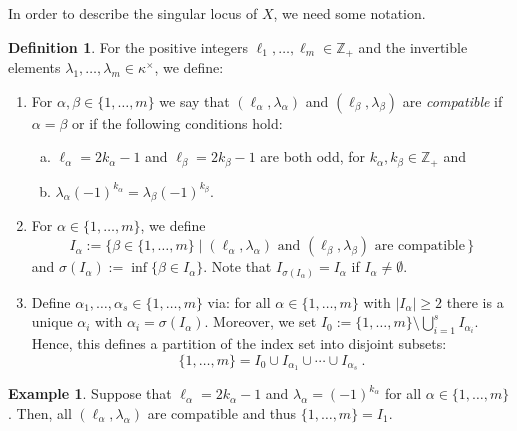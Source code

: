 \documentclass[letter,11pt]{amsart}
\newcommand{\ZZ}{\ensuremath{\mathbb{Z}}}
\theoremstyle{theorem}
\theoremstyle{definition}
\newtheorem{defi}[Thm]{Definition} %
\newtheorem{example}[Thm]{Example}
\newcommand{\len}{\ell}
\newcommand{\halflen}{k}
\numberwithin{equation}{section}
\begin{document}
In order to describe the singular locus of $ X $, we need some notation.
 
 \begin{defi}
 	\label{Def:partition}
 	For the positive integers $ \len_1, \ldots, \len_m \in \ZZ_+ $ and the invertible elements $\lambda_1, \ldots, \lambda_m \in \kappa^\times $,
 	we define: 
 	
 	\begin{enumerate}[(1)]
 	\item \label{item:compatible}
 	For $ \alpha, \beta \in \{ 1, \ldots, m \} $ %
 	we say that 
 	$ (\len_\alpha, \lambda_\alpha) $ and $ (\len_\beta, \lambda_\beta) $ 
 	are {\em compatible}
 	if 
 	$ \alpha = \beta $ or if the following conditions hold:
 	\begin{enumerate}[(a)]
 		\item
 		$ \len_\alpha = 2 \halflen_\alpha - 1 $ and $\len_\beta = 2 \halflen_\beta - 1  $ are both odd, 
 		for $ \halflen_\alpha, \halflen_\beta \in \ZZ_+ $
 		and
 		
 		\item
 		$ \lambda_\alpha (-1)^{\halflen_\alpha} = \lambda_\beta (-1)^{\halflen_\beta}  $. 
 	\end{enumerate}
 
	\item 
	For $ \alpha \in \{ 1, \ldots, m \} $,
	we define 
	\[
		I_\alpha := 
		\{
			\beta \in \{ 1, \ldots, m \}
			\mid 
			 (\len_\alpha, \lambda_\alpha) 
			\mbox{ and }
			(\len_\beta, \lambda_\beta) 
			\mbox{ are compatible} 
			\,
		\}
	\]
	and $ \sigma(I_\alpha) := \inf\{ \beta \in I_\alpha \}  $.
	Note that $ I_{\sigma(I_\alpha)} = I_\alpha $ if $ I_\alpha \neq \emptyset $.
 	
 	\item\label{Def:partition-item}
 	Define $ \alpha_1, \ldots, \alpha_s \in \{1, \ldots, m \} $ 
 	via:
 		for all $ \alpha \in \{ 1, \ldots, m \} $ with $ |I_{\alpha}| \geq 2 $ there is a unique $ \alpha_i $ with 
 		$ \alpha_i = \sigma(I_\alpha) $.
 	Moreover, we set $ I_0 := \{ 1, \ldots, m \} \setminus \bigcup_{i=1}^s I_{\alpha_i} $. 
 	Hence, this defines a partition of the index set into disjoint subsets:
 	\[
	 	\{ 1 , \ldots , m \}  = I_0 \cup I_{\alpha_1} \cup \cdots \cup I_{\alpha_s}
	 	\ .
 	\]
 \end{enumerate}
 \end{defi}
 
 \begin{example}
 	\label{Ex:Comaptible}
	\label{it:compat_A_1}
 	Suppose that $ \ell_\alpha = 2 k_\alpha - 1 $ 
 	and $ \lambda_\alpha = (-1)^{k_\alpha} $
 	for all $ \alpha \in \{ 1 , \ldots, m \} $. 
 	Then, all $ (\ell_\alpha, \lambda_\alpha) $ are compatible and thus $ \{ 1 , \ldots, m \} = I_1 $. 
 \end{example}
\end{document}
